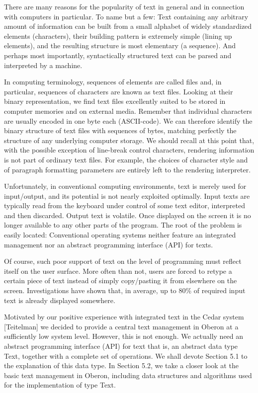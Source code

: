 There are many reasons for the popularity of text in general and in
connection with computers in particular. To name but a few: Text
containing any arbitrary amount of information can be built from a
small alphabet of widely standardized elements (characters), their
building pattern is extremely simple (lining up elements), and the
resulting structure is most elementary (a sequence). And perhaps most
importantly, syntactically structured text can be parsed and
interpreted by a machine.

In computing terminology, sequences of elements are called files and,
in particular, sequences of characters are known as text
files. Looking at their binary representation, we find text files
excellently suited to be stored in computer memories and on external
media. Remember that individual characters are usually encoded in one
byte each (ASCII-code). We can therefore identify the binary structure
of text files with sequences of bytes, matching perfectly the
structure of any underlying computer storage. We should recall at this
point that, with the possible exception of line-break control
characters, rendering information is not part of ordinary text
files. For example, the choices of character style and of paragraph
formatting parameters are entirely left to the rendering interpreter.

Unfortunately, in conventional computing environments, text is merely
used for input/output, and its potential is not nearly exploited
optimally. Input texts are typically read from the keyboard under
control of some text editor, interpreted and then discarded. Output
text is volatile. Once displayed on the screen it is no longer
available to any other parts of the program. The root of the problem
is easily located: Conventional operating systems neither feature an
integrated management nor an abstract programming interface (API) for
texts.

Of course, such poor support of text on the level of programming must
reflect itself on the user surface. More often than not, users are
forced to retype a certain piece of text instead of simply
copy/pasting it from elsewhere on the screen. Investigations have
shown that, in average, up to 80\% of required input text is already
displayed somewhere.

Motivated by our positive experience with integrated text in the Cedar
system [Teitelman] we decided to provide a central text management in
Oberon at a sufficiently low system level. However, this is not
enough. We actually need an abstract programming interface (API) for
text that is, an abstract data type Text, together with a complete set
of operations. We shall devote Section 5.1 to the explanation of this
data type. In Section 5.2, we take a closer look at the basic text
management in Oberon, including data structures and algorithms used
for the implementation of type Text.

